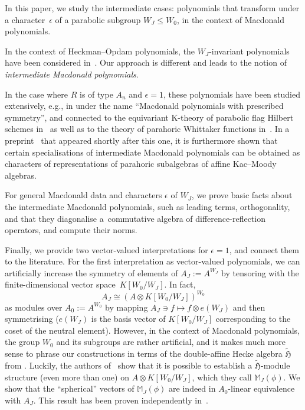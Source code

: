 \documentclass[pdftex]{sigma}
\theoremstyle{definition}
\numberwithin{equation}{section}
\begin{document}
In this paper, we study the intermediate cases: polynomials
that transform under a character~$\epsilon$ of a parabolic subgroup $W_J\le W_0$, in the
context of Macdonald polynomials.

In the context of Heckman--Opdam polynomials, the $W_J$-invariant polynomials
have been considered in~\cite{mvpVectorValued}. Our approach is
different and leads
to the notion of \emph{intermediate Macdonald polynomials}.

In the case where $R$ is of type $A_n$ and $\epsilon=1$,
these polynomials have been studied extensively, e.g., in
\cite{BDF97, baratta,goodberry,lapointe} under the name ``Macdonald polynomials with prescribed symmetry'', and connected to the
equivariant K-theory of parabolic flag Hilbert schemes in~\cite{goodberryGeometric} as well as to the theory of parahoric Whittaker functions in~\cite{BBBG24}. In a preprint~\cite{FKhM} that appeared shortly after this one, it is furthermore shown that certain specialisations of intermediate Macdonald polynomials can be obtained as characters of representations of parahoric subalgebras of affine Kac--Moody algebras.

For general Macdonald data and characters $\epsilon$ of $W_J$, we prove basic facts about the intermediate Macdonald polynomials,
such as leading terms, orthogonality, and that they diagonalise a~commutative algebra
of difference-reflection operators, and compute their norms.

Finally, we provide two vector-valued interpretations for $\epsilon=1$,
and connect them to the literature.
For the first interpretation as vector-valued polynomials, we can artificially increase the symmetry of elements of $A_J:= A^{W_J}$
by tensoring with the finite-dimensional vector space~${K[W_0/W_J]}$. In fact,
\[
 A_J \cong (A\otimes K[W_0/W_J])^{W_0}
\]
as modules over $A_0:= A^{W_0}$ by mapping $A_J\ni f\mapsto f\otimes e(W_J)$ and then symmetrising ($e(W_J)$ is the basis vector of $K[W_0/W_J]$ corresponding to the coset of the neutral element). However, in the context of Macdonald
polynomials, the group $W_0$ and its subgroups are rather artificial,
and it makes much more sense to phrase our constructions in terms of
the double-affine Hecke algebra $\tilde{\mathfrak{H}}$ from
\cite{macdonald}. Luckily, the authors of~\cite{stokmanInduced} show that it is possible to establish a $\tilde{\mathfrak{H}}$-module structure (even more than one) on $A\otimes K[W_0/W_J]$, which they call
$\mathbb{M}_J(\phi)$. We show that the ``spherical'' vectors
of $\mathbb{M}_J(\phi)$ are indeed in $A_0$-linear equivalence with $A_J$.
This result has been proven independently in~\cite{Ven25}.
\end{document}
